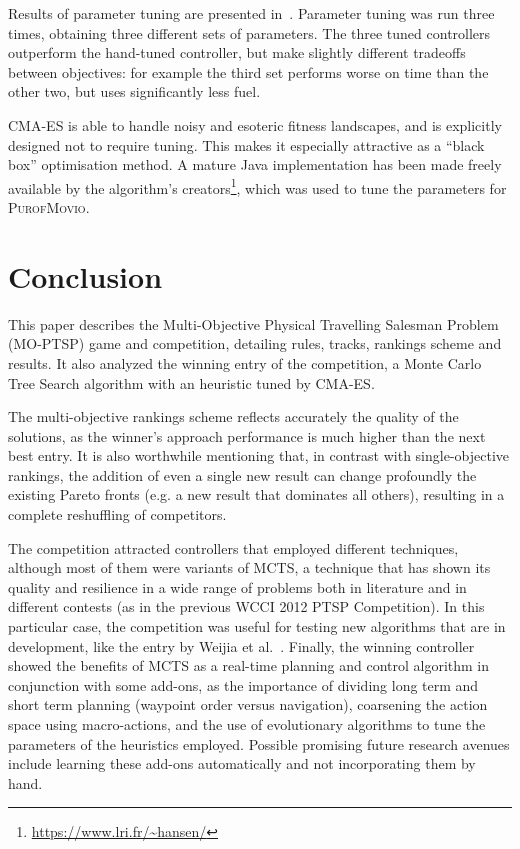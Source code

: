 \documentclass[conference]{IEEEtran}
\begin{document}
Results of parameter tuning are presented in~\cite{Powley2013_moptsp}.
Parameter tuning was run three times, obtaining three different sets of parameters.
The three tuned controllers outperform the hand-tuned controller,
but make slightly different tradeoffs between objectives:
for example the third set performs worse on time than the other two, but uses significantly less fuel.

CMA-ES is able to handle noisy and esoteric fitness landscapes, and is explicitly designed not to require tuning.
This makes it especially attractive as a ``black box'' optimisation method.
A mature Java implementation has been made freely available by the algorithm's creators\footnote{\url{https://www.lri.fr/~hansen/}},
which was used to tune the parameters for \textsc{PurofMovio}.

\section{Conclusion} \label{sec:conc}

This paper describes the Multi-Objective Physical Travelling Salesman Problem (MO-PTSP) game and competition, detailing rules, tracks, rankings scheme and results. It also analyzed the winning entry of the competition, a Monte Carlo Tree Search algorithm with an heuristic tuned by CMA-ES.  

The multi-objective rankings scheme reflects accurately the quality of the solutions, as the winner's approach performance is much higher than the next best entry. It is also worthwhile mentioning that, in contrast with single-objective rankings, the addition of even a single new result can change profoundly the existing Pareto fronts (e.g. a new result that dominates all others), resulting in a complete reshuffling of competitors.

The competition attracted controllers that employed different techniques, although most of them were variants of MCTS, a technique that has shown its quality and resilience in a wide range of problems both in literature and in different contests (as in the previous WCCI 2012 PTSP Competition). In this particular case, the competition was useful for testing new algorithms that are in development, like the entry by Weijia et al.~\cite{Wang13}. Finally, the winning controller showed the benefits of MCTS as a real-time planning and control algorithm in conjunction with some add-ons, as the importance of dividing long term and short term planning (waypoint order versus navigation), coarsening the action space using macro-actions, and the use of evolutionary algorithms to tune the parameters of the heuristics employed. Possible promising future research avenues include learning these add-ons automatically and not incorporating them by hand. 




\end{document}
